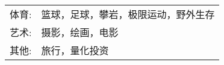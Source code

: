 %
%



\begin{tabular}{rl}
    \textsc{体育:} & 篮球，足球，攀岩，极限运动，野外生存 \\
    \textsc{艺术:} & 摄影，绘画，电影 \\ 
    \textsc{其他:} & 旅行，量化投资\\
\end{tabular}